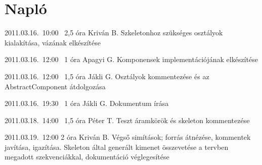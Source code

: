 %
\section{Napló}

\begin{naplo}

\bejegyzes
{2011.03.16.~10:00~} %
{2,5 óra} %
{Kriván B.} %
{Szkeletonhoz szükséges osztályok kialakítása, vázának elkészítése} %

\bejegyzes
{2011.03.16.~12:00~} %
{1 óra} %
{Apagyi G.} %
{Komponensek implementációjának elkészítése} %

\bejegyzes
{2011.03.16.~12:00~} %
{1,5 óra} %
{Jákli G.} %
{Osztályok kommentezése és az AbstractComponent átdolgozása} %

\bejegyzes
{2011.03.16.~19:30~} %
{1 óra} %
{Jákli G.} %
{Dokumentum írása} %

\bejegyzes
{2011.03.18.~14:00~} %
{1,5 óra} %
{Péter T.} %
{Teszt áramkörök és skeleton kommentezése} %

\bejegyzes
{2011.03.19.~12:00}
{2 óra}
{Kriván B.}
{Végső simítások; forrás átnézése, kommentek javítása, igazítása. Skeleton által generált kimenet összevetése a tervben megadott szekvenciákkal, dokumentáció véglegesítése}

\end{naplo}


